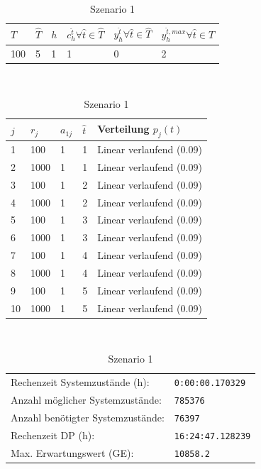 \begin{table}[h!]
\renewcommand{\arraystretch}{1.5}
  \begin{center}
    \caption{Szenario 1}  \label{S1}
    \vspace*{3mm}
    \begin{tabular}{l l l l l l}   %
    $T$ & $\hat T$  & $h$ & $c_h^{\hat t}\forall \hat{t}\in{\hat T}$ & $y_h^{\hat t}\forall \hat{t}\in{\hat T}$  & $y_h^{{\hat t},max}\forall \hat{t}\in{\hat T}$  \\  \hline
100 & 5 & 1 & 1 & 0 & 2  \\ \hline
    \end{tabular} \\[3mm]
        \begin{tabular}{p{1cm} p{1cm} p{1cm}  p{1cm} p{6cm}}   %
    $j$ & $r_j$  & $a_{1j}$ & $\hat t$ & Verteilung $p_j(t)$ \\  \hline
1 & 100 & 1 & 1 & Linear verlaufend (0.09)   \\
2 & 1000 & 1 & 1 & Linear verlaufend (0.09)  \\
3 & 100 & 1 & 2 & Linear verlaufend (0.09)  \\
4 & 1000 & 1 & 2 & Linear verlaufend (0.09)  \\
5 & 100 & 1 & 3 & Linear verlaufend (0.09)  \\
6 & 1000 & 1 & 3 & Linear verlaufend (0.09)  \\
7 & 100 & 1 & 4 & Linear verlaufend (0.09)  \\
8 & 1000 & 1 & 4 & Linear verlaufend (0.09)  \\
9 & 100 & 1 & 5 & Linear verlaufend (0.09)  \\
10 & 1000 & 1 & 5 & Linear verlaufend (0.09)  \\ \hline
    \end{tabular} \\[3mm]
     \begin{tabular}{p{7cm}p{5cm}} \hline
     Rechenzeit Systemzustände (h): & \texttt{0:00:00.170329} \\
     Anzahl möglicher Systemzustände: & \texttt{785376} \\
     Anzahl benötigter Systemzustände: & \texttt{76397} \\ 
     Rechenzeit DP (h): & \texttt{16:24:47.128239} \\ 
          Max. Erwartungswert (GE): & \texttt{10858.2} \\ \hline
         \end{tabular} \\[3mm]
  \end{center}
\end{table}


